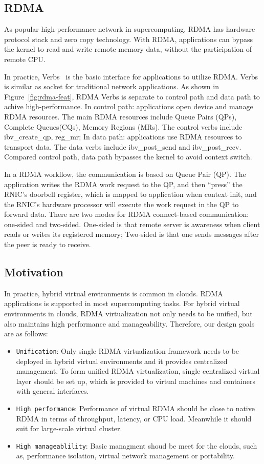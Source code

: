 \subsection{RDMA}
As popular high-performance network in supercomputing, RDMA has hardware protocol stack and zero copy technology. With RDMA, applications can bypass the kernel to read and write remote memory data, without the participation of remote CPU. 

In practice, Verbs~\cite{verbs} is the basic interface for applications to utilize RDMA. Verbs is similar as socket for traditional network applications. As shown in Figure~\ref{fig:rdma-feat}, RDMA Verbs is separate to control path and data path to achive high-performance. In control path: applications open device and manage RDMA resources. The main RDMA resources include Queue Pairs (QPs), Complete Queues(CQs), Memory Regions (MRs). The control verbs include ibv\_create\_qp, reg\_mr;  In data path: applications use RDMA resources to transport data. The data verbs include ibv\_post\_send and ibv\_post\_recv. Compared control path, data path bypasses the kernel to avoid context switch.

In a RDMA workflow, the communication is based on Queue Pair (QP). The application writes the RDMA work request to the QP, and then ``press''  the RNIC's doorbell register, which is mapped to application when context init, and the RNIC's hardware processor will execute the work request in the QP to forward data. There are two modes for RDMA connect-based communication: one-sided and two-sided. One-sided is that remote server is awareness when client reads or writes its registered memory; Two-sided is that one sends messages after the peer is ready to receive.

\subsection{Motivation}
In practice, hybrid virtual environments is common in clouds. RDMA applications is supported in most supercomputing tasks. For hybrid virtual environments in clouds, RDMA virtualization not only needs to be unified, but also maintains high performance and manageability. Therefore, our design goals are as follows:

\begin{itemize}
\item {\verb|Unification|}: Only single RDMA virtualization framework needs to be deployed in hybrid virtual environments and it provides centralized management.
To form unified RDMA virtualization, single centralized virtual layer should be set up, which is provided to virtual machines and containers with general interfaces.
\item {\verb|High performance|}: Performance of virtual RDMA should be close to native RDMA in terms of throughput, latency, or CPU load. Meanwhile it should suit for large-scale virtual cluster.
\item {\verb|High manageablility|}: Basic managment shoud be meet for the clouds, such as, performance isolation, virtual network management or portability.
\end{itemize}
